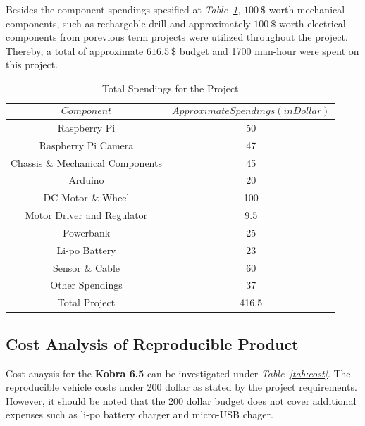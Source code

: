 \documentclass[a4paper,12pt]{article}
\begin{document}
		Besides the component spendings spesified at \textit{Table~\ref{tab:totalcost}}, $100~\$$ worth mechanical components, such as rechargeble drill and approximately $100~\$$ worth electrical components from porevious term projects were utilized throughout the project. Thereby, a total of approximate $616.5~\$$ budget and  1700 man-hour were spent on this project.
		
		\begin{table}[H]
			\centering
			\caption{Total Spendings for the Project}
			\begin{tabular}{c|c}
				$$Component$$ &  $$Approximate Spendings (in Dollar)$$  \\ \hline
				Raspberry Pi & 50   \\ \hline
				Raspberry Pi Camera & 47   \\ \hline
				Chassis $\&$ Mechanical Components & 45   \\ \hline
				Arduino  & 20 \\ \hline
				DC Motor $\&$ Wheel & 100 \\ \hline
				Motor Driver and Regulator &  9.5 \\ \hline
				Powerbank & 25 \\ \hline
				Li-po Battery  &  23 \\ \hline
				Sensor $\&$ Cable & 60 \\ \hline
				Other Spendings & 37 \\ \hline
				Total Project & 416.5
			\end{tabular} 
			\label{tab:totalcost}
		\end{table}
		
	\subsection{Cost Analysis of Reproducible Product}

	Cost anaysis for the \textbf{Kobra 6.5} can be investigated under \textit{Table~\ref{tab:cost}}. The reproducible vehicle costs under 200 dollar as stated by the project requirements. However, it should be noted that the 200 dollar budget does not cover additional expenses such as li-po battery charger and micro-USB chager.
\end{document}

